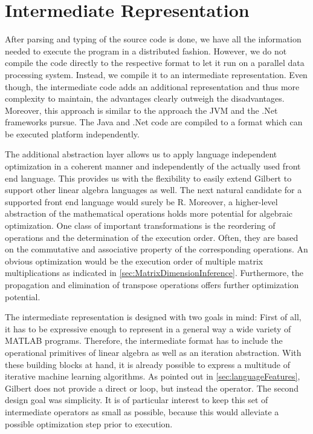 \chapter{Intermediate Representation}
\label{cha:intermediaterepresentation}


After parsing and typing of the source code is done, we have all the information needed to execute the program in a distributed fashion.
However, we do not compile the code directly to the respective format to let it run on a parallel data processing system.
Instead, we compile it to an intermediate representation.
Even though, the intermediate code adds an additional representation and thus more complexity to maintain, the advantages clearly outweigh the disadvantages.
Moreover, this approach is similar to the approach the JVM and the .Net frameworks pursue.
The Java and .Net code are compiled to a format which can be executed platform independently.

The additional abstraction layer allows us to apply language independent optimization in a coherent manner and independently of the actually used front end language.
This provides us with the flexibility to easily extend Gilbert to support other linear algebra languages as well.
The next natural candidate for a supported front end language would surely be R.
Moreover, a higher-level abstraction of the mathematical operations holds more potential for algebraic optimization.
One class of important transformations is the reordering of operations and the determination of the execution order.
Often, they are based on the commutative and associative property of the corresponding operations.
An obvious optimization would be the execution order of multiple matrix multiplications as indicated in \cref{sec:MatrixDimensionInference}.
Furthermore, the propagation and elimination of transpose operations offers further optimization potential.

The intermediate representation is designed with two goals in mind:
First of all, it has to be expressive enough to represent in a general way a wide variety of MATLAB programs.
Therefore, the intermediate format has to include the operational primitives of linear algebra as well as an iteration abstraction.
With these building blocks at hand, it is already possible to express a multitude of iterative machine learning algorithms.
As pointed out in \cref{sec:languageFeatures}, Gilbert does not provide a direct  or  loop, but instead the  operator.
The second design goal was simplicity.
It is of particular interest to keep this set of intermediate operators as small as possible, because this would alleviate a possible optimization step prior to execution.

